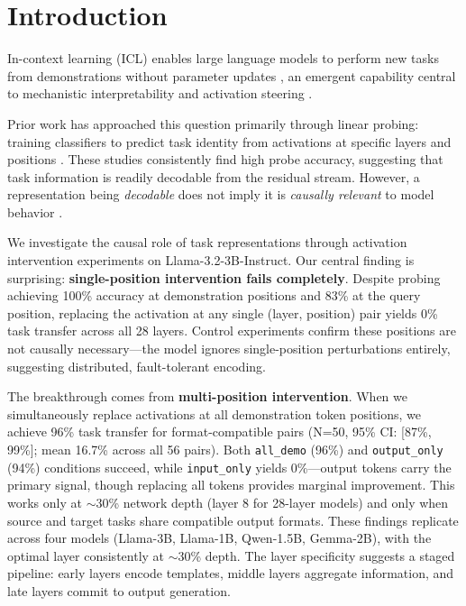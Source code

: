 \documentclass{article}
\begin{document}
\section{Introduction}
\label{sec:intro}

In-context learning (ICL) enables large language models to perform new tasks from demonstrations without parameter updates \citep{brown2020language,garg2022can}, an emergent capability \citep{wei2022emergent} central to mechanistic interpretability and activation steering \citep{turner2023activation}.

Prior work has approached this question primarily through linear probing: training classifiers to predict task identity from activations at specific layers and positions \citep{todd2023function,hendel2023context}. These studies consistently find high probe accuracy, suggesting that task information is readily decodable from the residual stream. However, a representation being \emph{decodable} does not imply it is \emph{causally relevant} to model behavior \citep{ravfogel2020null,elazar2021amnesic}.

We investigate the causal role of task representations through activation intervention experiments on Llama-3.2-3B-Instruct. Our central finding is surprising: \textbf{single-position intervention fails completely}. Despite probing achieving 100\% accuracy at demonstration positions and 83\% at the query position, replacing the activation at any single (layer, position) pair yields 0\% task transfer across all 28 layers. Control experiments confirm these positions are not causally necessary---the model ignores single-position perturbations entirely, suggesting distributed, fault-tolerant encoding.

The breakthrough comes from \textbf{multi-position intervention}. When we simultaneously replace activations at all demonstration token positions, we achieve 96\% task transfer for format-compatible pairs (N=50, 95\% CI: [87\%, 99\%]; mean 16.7\% across all 56 pairs). Both \texttt{all\_demo} (96\%) and \texttt{output\_only} (94\%) conditions succeed, while \texttt{input\_only} yields 0\%---output tokens carry the primary signal, though replacing all tokens provides marginal improvement. This works only at $\sim$30\% network depth (layer 8 for 28-layer models) and only when source and target tasks share compatible output formats. These findings replicate across four models (Llama-3B, Llama-1B, Qwen-1.5B, Gemma-2B), with the optimal layer consistently at $\sim$30\% depth. The layer specificity suggests a staged pipeline: early layers encode templates, middle layers aggregate information, and late layers commit to output generation.
\end{document}

